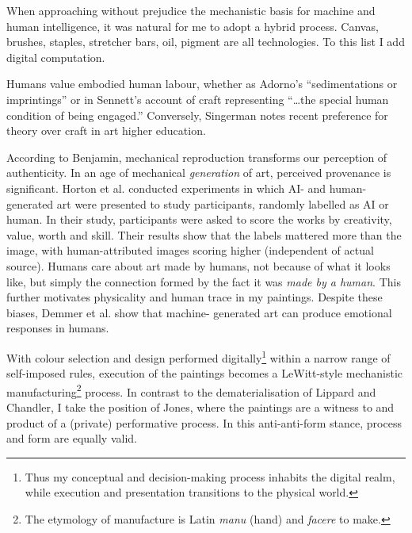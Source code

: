 \documentclass[12pt]{article}
\begin{document}
When approaching without prejudice the mechanistic basis for machine
and human intelligence, it was natural for me to adopt a hybrid
process. Canvas, brushes, staples, stretcher bars, oil, pigment are
all technologies. To this list I add digital computation.

Humans value embodied human labour, whether as Adorno's
``sedimentations or imprintings''\cite[p.~5]{adorno1970aesthetic} or
in Sennett's account of craft representing ``\dots the special human
condition of being engaged.''\cite[p.~20]{sennett2008craftsman}
Conversely, Singerman notes recent preference for theory over craft
in art higher education.\cite[pp.~23--27]{singerman1999artist}

According to Benjamin, mechanical reproduction transforms our
perception of authenticity.\cite{benjamin1969art} In an age of
mechanical \emph{generation} of art, perceived provenance is
significant. Horton et al. conducted experiments in which AI- and human-
generated art were presented to study participants, randomly labelled
as AI or human.\cite{horton2023bias} In their study, participants were
asked to score the works by creativity, value, worth and skill. Their
results show that the labels mattered more than the image, with
human-attributed images scoring higher (independent of actual source).
Humans care about art made by humans, not because of what it looks
like, but simply the connection formed by the fact it was \emph{made
  by a human}. This further motivates physicality and human trace in
my paintings. Despite these biases, Demmer et al. show that machine-
generated art can produce emotional responses in
humans.\cite{demmer2023does}

With colour selection and design performed digitally\footnote{Thus my
  conceptual and decision-making process inhabits the digital realm,
  while execution and presentation transitions to the physical world.}
within a narrow range of self-imposed rules, execution of the
paintings becomes a LeWitt-style\cite[Sentence
\#28]{LeWitt1969Sentences} mechanistic manufacturing\footnote{The
  etymology of manufacture is Latin \emph{manu} (hand) and
  \emph{facere} to make.} process. In contrast to the
dematerialisation of Lippard and
Chandler,\cite{LippardChandler1968Dematerialization,lippard1973sixyears}
I take the position of Jones,\cite[pp.~12--13]{Jones1998BodyArt} where
the paintings are a witness to and product of a (private) performative
process. In this anti-anti-form\cite{Morris1968AntiForm} stance,
process and form are equally valid.
\end{document}

